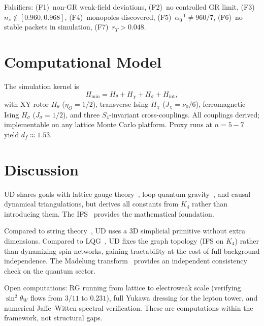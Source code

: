 \documentclass[11pt,twocolumn]{article}
\begin{document}
Falsifiers:
(F1)~non-GR weak-field deviations,
(F2)~no controlled GR limit,
(F3)~$n_s\notin[0.960,0.968]$,
(F4)~monopoles discovered,
(F5)~$\alpha_0^{-1}\neq 960/7$,
(F6)~no stable packets in simulation,
(F7)~$r_T>0.048$.

\section{Computational Model}
\label{sec:computation}

The simulation kernel is
\begin{equation}
H_{\min} = H_\theta + H_\chi + H_\sigma + H_{\mathrm{int}},
\label{eq:Hmin}
\end{equation}
with XY rotor $H_\theta$ ($\eta_O=1/2$), transverse Ising $H_\chi$ ($J_\chi=\nu_0/6$), ferromagnetic Ising $H_\sigma$ ($J_\sigma=1/2$), and three $S_4$-invariant cross-couplings.
All couplings derived; implementable on any lattice Monte Carlo platform.
Proxy runs at $n=5{-}7$ yield $d_f\approx 1.53$.

\section{Discussion}
\label{sec:discussion}

UD shares goals with lattice gauge theory~\cite{wilson1974}, loop quantum gravity~\cite{rovelli2004}, and causal dynamical triangulations, but derives all constants from $K_4$ rather than introducing them.
The IFS~\cite{hutchinson1981,falconer2003} provides the mathematical foundation.

Compared to string theory~\cite{polyakov1987}, UD uses a 3D simplicial primitive without extra dimensions.
Compared to LQG~\cite{rovelli2004}, UD fixes the graph topology (IFS on $K_4$) rather than dynamizing spin networks, gaining tractability at the cost of full background independence.
The Madelung transform~\cite{madelung1927} provides an independent consistency check on the quantum sector.

Open computations: RG running from lattice to electroweak scale (verifying $\sin^2\theta_W$ flows from $3/11$ to $0.231$), full Yukawa dressing for the lepton tower, and numerical Jaffe--Witten spectral verification.
These are computations within the framework, not structural gaps.
\end{document}
